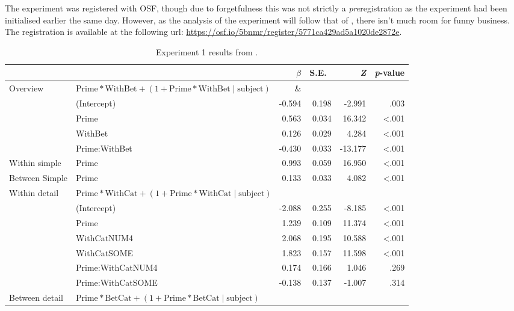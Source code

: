 \documentclass[10pt]{article}
\begin{document}
\begin{multicols}{2}
The experiment was registered with OSF, though due to forgetfulness this was not strictly a \emph{pre}registration as the experiment had been initialised earlier the same day.
However, as the analysis of the experiment will follow that of \citeauthor{Bott:2016aa}, there isn't much room for funny business.
The registration is available at the following url: \url{https://osf.io/5bnmr/register/5771ca429ad5a1020de2872e}.



\begin{table*}[ht]
  \caption{Experiment 1 results from \textcite[125]{Bott:2016aa}.}\vspace{-20pt}
  \begin{center}
    \begin{tabular}{llrrrr}
      \hline
      & & \(\beta\) & S.E.\ & \emph{Z} & \emph{p}-value  \\
      \hline
      Overview & \(\text{Prime} * \text{WithBet} + (1 + \text{Prime} * \text{WithBet} \mid \text{subject})\) & \& & & \\
      & (Intercept) & -0.594 & 0.198 & -2.991 & .003 \\
      & Prime & 0.563 & 0.034 & 16.342 & <.001 \\
      & WithBet & 0.126 & 0.029 & 4.284 & <.001 \\
      & Prime:WithBet & -0.430 & 0.033 & -13.177 & <.001 \\
      Within simple & Prime & 0.993 & 0.059 & 16.950 & <.001 \\
      Between Simple & Prime & 0.133 & 0.033 & 4.082 & <.001 \\
      Within detail & \multicolumn{2}{l}{\(\text{Prime} * \text{WithCat} + (1 + \text{Prime} * \text{WithCat} \mid \text{subject})\)}  & & & \\
      & (Intercept)  & -2.088 & 0.255 & -8.185 & <.001\\
      & Prime & 1.239 & 0.109 & 11.374 & <.001 \\
      & WithCatNUM4 & 2.068 & 0.195 & 10.588 & <.001 \\
      & WithCatSOME & 1.823 & 0.157 & 11.598 & <.001 \\
      & Prime:WithCatNUM4 & 0.174 & 0.166 & 1.046 & .269 \\
      & Prime:WithCatSOME & -0.138 & 0.137 & -1.007 & .314 \\
      Between detail & \multicolumn{2}{l}{\(\text{Prime} * \text{BetCat} + (1 + \text{Prime} * \text{BetCat} \mid \text{subject})\)}  & & & \\

\end{tabular}
\end{center}
\end{table*}
\end{multicols}
\end{document}
